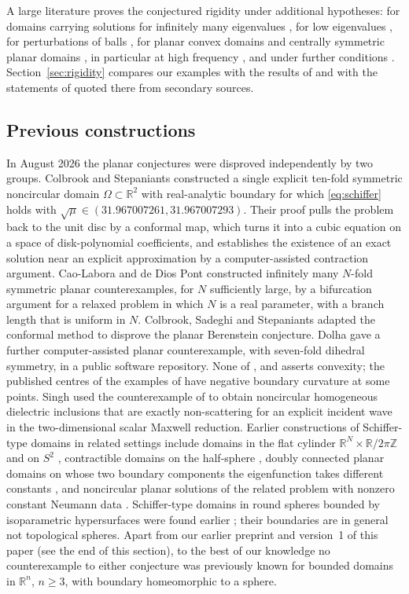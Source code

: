 \documentclass[11pt]{amsart}
\theoremstyle{definition}
\theoremstyle{remark}
\numberwithin{equation}{section}
\newcommand{\R}{\mathbb{R}}
\newcommand{\Z}{\mathbb{Z}}
\begin{document}
A large literature proves the conjectured rigidity under additional hypotheses: for domains carrying solutions for infinitely many eigenvalues \cite{BY87}, for low eigenvalues \cite{Den12}, for perturbations of balls \cite{Agr93,Kob93,Can14}, for planar convex domains \cite{BK82} and centrally symmetric planar domains \cite{Mon26}, in particular at high frequency \cite{DSWZ25}, and under further conditions \cite{Dal99,KL20}. Section~\ref{sec:rigidity} compares our examples with the results of \cite{BY87,Den12,Kob93,BK82,Mon26,Dal00,DSWZ25} and with the statements of \cite{Ber80,Avi86,DLS26} quoted there from secondary sources.

\subsection{Previous constructions}

In August 2026 the planar conjectures were disproved independently by two groups. Colbrook and Stepaniants \cite{CS26} constructed a single explicit ten-fold symmetric noncircular domain $\Omega\subset\R^2$ with real-analytic boundary for which \eqref{eq:schiffer} holds with $\sqrt\mu\in(31.967007261,31.967007293)$. Their proof pulls the problem back to the unit disc by a conformal map, which turns it into a cubic equation on a space of disk-polynomial coefficients, and establishes the existence of an exact solution near an explicit approximation by a computer-assisted contraction argument. Cao-Labora and de Dios Pont \cite{CLdDP26} constructed infinitely many $N$-fold symmetric planar counterexamples, for $N$ sufficiently large, by a bifurcation argument for a relaxed problem in which $N$ is a real parameter, with a branch length that is uniform in $N$. Colbrook, Sadeghi and Stepaniants \cite{CSS26} adapted the conformal method to disprove the planar Berenstein conjecture. Dolha \cite{Dol26} gave a further computer-assisted planar counterexample, with seven-fold dihedral symmetry, in a public software repository. None of \cite{CS26}, \cite{CLdDP26} and \cite{CSS26} asserts convexity; the published centres of the examples of \cite{CS26,Dol26} have negative boundary curvature at some points. Singh \cite{Sin26} used the counterexample of \cite{CS26} to obtain noncircular homogeneous dielectric inclusions that are exactly non-scattering for an explicit incident wave in the two-dimensional scalar Maxwell reduction. Earlier constructions of Schiffer-type domains in related settings include domains in the flat cylinder $\R^N\times\R/2\pi\Z$ and on $S^2$ \cite{FMW25}, contractible domains on the half-sphere \cite{CLF25}, doubly connected planar domains on whose two boundary components the eigenfunction takes different constants \cite{EFRS25}, and noncircular planar solutions of the related problem with nonzero constant Neumann data \cite{Whe25}. Schiffer-type domains in round spheres bounded by isoparametric hypersurfaces were found earlier \cite{Shk00,PS21}; their boundaries are in general not topological spheres. Apart from our earlier preprint \cite{Guo26} and version~1 of this paper (see the end of this section), to the best of our knowledge no counterexample to either conjecture was previously known for bounded domains in $\R^n$, $n\geq3$, with boundary homeomorphic to a sphere.
\end{document}
